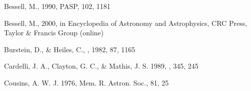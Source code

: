 


 Bessell, M., 1990, PASP, 102, 1181

 Bessell, M., 2000, in Encyclopedia of Astronomy and Astrophysics, CRC Press, Taylor \& Francis Group (online)

  Burstein, D., \& Heiles, C., \aj, 1982, 87, 1165



 Cardelli, J. A., Clayton, G. C., \& Mathis, J. S. 1989, \apj, 345, 245
 
 

 
 



 Cousins, A. W. J. 1976, Mem. R.  Astron. Soc., 81, 25

